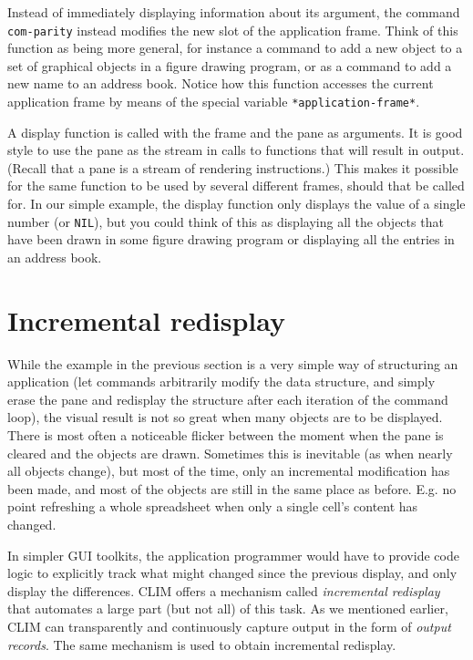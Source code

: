 Instead of immediately displaying information about its argument, the
command \texttt{com-parity} instead modifies the new slot of the
application frame.  Think of this function as being more general, for
instance a command to add a new object to a set of graphical objects
in a figure drawing program, or as a command to add a new name to an
address book.  Notice how this function accesses the current
application frame by means of the special variable
\texttt{*application-frame*}.

A display function is called with the frame and the pane as arguments.
It is good style to use the pane as the stream in calls to functions
that will result in output.  (Recall that a pane is a stream of
rendering instructions.) This makes it possible for the same function
to be used by several different frames, should that be called for.  In
our simple example, the display function only displays the value of a
single number (or \texttt{NIL}), but you could think of this as
displaying all the objects that have been drawn in some figure drawing
program or displaying all the entries in an address book.

\section{Incremental redisplay}

While the example in the previous section is a very simple way of
structuring an application (let commands arbitrarily modify the data
structure, and simply erase the pane and redisplay the structure after
each iteration of the command loop), the visual result is not so great
when many objects are to be displayed.  There is most often a
noticeable flicker between the moment when the pane is cleared and the
objects are drawn.  Sometimes this is inevitable (as when nearly all
objects change), but most of the time, only an incremental
modification has been made, and most of the objects are still in the
same place as before. E.g. no point refreshing a whole spreadsheet
when only a single cell's content has changed.

In simpler GUI toolkits, the application programmer would have to
provide code logic to explicitly track what might changed since the
previous display, and only display the differences.  CLIM offers a
mechanism called \emph{incremental redisplay} that automates a large
part (but not all) of this task.  As we mentioned earlier, CLIM can
transparently and continuously capture output in the form of
\emph{output records}.  The same mechanism is used to obtain
incremental redisplay.

